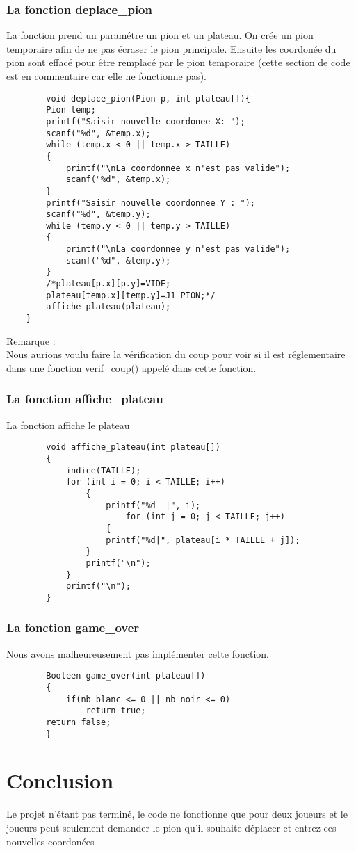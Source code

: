 \documentclass{article}
\begin{document}
    \subsubsection{La fonction deplace\_pion}
    La fonction prend un paramétre un pion et un plateau. On crée un pion temporaire afin de ne pas écraser le pion principale.
    Ensuite les coordonée du pion sont effacé pour être remplacé par le pion temporaire (cette section de code est en commentaire car elle ne fonctionne pas).
    \begin{lstlisting}
        void deplace_pion(Pion p, int plateau[]){
        Pion temp;
        printf("Saisir nouvelle coordonee X: ");
        scanf("%d", &temp.x);
        while (temp.x < 0 || temp.x > TAILLE)
        {
            printf("\nLa coordonnee x n'est pas valide");
            scanf("%d", &temp.x);
        }
        printf("Saisir nouvelle coordonnee Y : ");
        scanf("%d", &temp.y);
        while (temp.y < 0 || temp.y > TAILLE)
        {
            printf("\nLa coordonnee y n'est pas valide");
            scanf("%d", &temp.y);
        }
        /*plateau[p.x][p.y]=VIDE;
        plateau[temp.x][temp.y]=J1_PION;*/
        affiche_plateau(plateau);
    }
    \end{lstlisting}
    \underline{Remarque : } \\ Nous aurions voulu faire la vérification du coup pour voir si il est réglementaire dans une fonction verif\_coup() appelé dans cette fonction.
    \newpage
    \subsubsection{La fonction affiche\_plateau}
    La fonction affiche le plateau 
    \begin{lstlisting}
        void affiche_plateau(int plateau[])
        {
            indice(TAILLE);
            for (int i = 0; i < TAILLE; i++)
                {
                    printf("%d  |", i);
                        for (int j = 0; j < TAILLE; j++)
                    {
                    printf("%d|", plateau[i * TAILLE + j]);
                }
                printf("\n");
            }
            printf("\n");
        }
    \end{lstlisting}
    \subsubsection{La fonction game\_over}
    Nous avons malheureusement pas implémenter cette fonction.
    \begin{lstlisting}
        Booleen game_over(int plateau[])
        {
            if(nb_blanc <= 0 || nb_noir <= 0)
                return true;
        return false;
        }
    \end{lstlisting}
    \section{Conclusion}
    Le projet n'étant pas terminé, le code ne fonctionne que pour deux joueurs et le joueurs peut seulement demander le pion qu'il souhaite déplacer et entrez ces nouvelles coordonées
\end{document}
